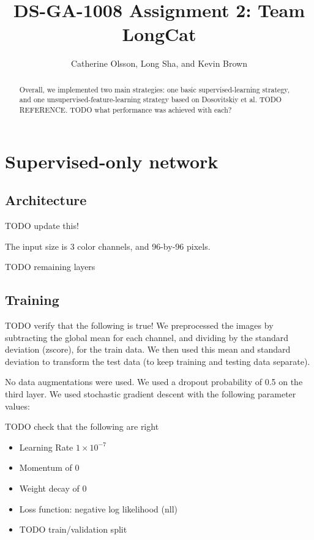 \documentclass{article} %
\title{DS-GA-1008 Assignment 2: Team LongCat}
\author{
Catherine Olsson, Long Sha, and Kevin Brown \\
}
\newenvironment{itemizedense}{
\begin{itemize}
  \setlength{\itemsep}{1pt}
  \setlength{\parskip}{0pt}
  \setlength{\parsep}{0pt}
}{\end{itemize}}
\begin{document}
\maketitle

\begin{abstract}
Overall, we implemented two main strategies: one basic supervised-learning
strategy, and one unsupervised-feature-learning strategy based on Dosovitskiy
et al. TODO REFERENCE. TODO what performance was achieved with each?
\end{abstract}

\section{Supervised-only network}

\subsection{Architecture}
TODO update this!

The input size is 3 color channels, and 96-by-96 pixels. 

TODO remaining layers

\subsection{Training}

TODO verify that the following is true!
We preprocessed the images by subtracting the global mean for each channel, and dividing by the standard deviation (zscore), for the train data. We then used this mean and standard deviation to transform the test data (to keep training and testing data separate).

No data augmentations were used. We used a dropout probability of 0.5 on the third layer. We used stochastic gradient descent with the following parameter values:

TODO check that the following are right

\begin{itemizedense}
\item Learning Rate $1 \times 10^{-7}$
\item Momentum of $0$
\item Weight decay of $0$
\item Loss function: negative log likelihood (nll)
\item TODO train/validation split
\end{itemizedense}
\end{document}
